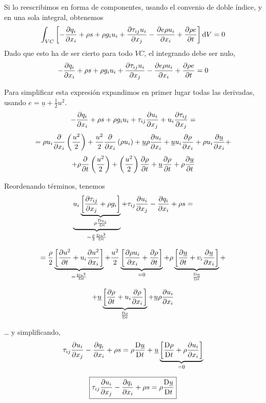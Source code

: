 	Si lo reescribimos en forma de componentes, usando el convenio de
	doble índice, y en una sola integral, obtenemos 
	\[
	\int_{VC}\left[-\frac{\partial q_{i}}{\partial x_{i}}+\rho s+\rho g_{i}u_{i}+\frac{\partial \tau_{ij}u_{i}}{\partial x_{j}}-\frac{\partial e\rho u_{i}}{\partial x_{i}}+\frac{\partial \rho e}{\partial t}\right]\text{d} V=0
	\]
	Dado que esto ha de ser cierto para todo $VC$, el integrando debe
	ser nulo, 
	\[
	-\frac{\partial q_{i}}{\partial x_{i}}+\rho s+\rho g_{i}u_{i}+\frac{\partial \tau_{ij}u_{i}}{\partial x_{j}}-\frac{\partial e\rho u_{i}}{\partial x_{i}}+\frac{\partial \rho e}{\partial t}=0
	\]
	

	
	Para simplificar esta expresión expandimos en primer lugar todas las
	derivadas, usando $e=\underline{u}+\frac{1}{2}u^{2}$. 
	\[
	-\frac{\partial q_{i}}{\partial x_{i}}+\rho s+\rho g_{i}u_{i}+\tau_{ij}\frac{\partial u_{i}}{\partial x_{j}}+u_{i}\frac{\partial \tau_{ij}}{\partial x_{j}}=
	\]
	\[
	=\rho u_{i}\frac{\partial }{\partial x_{i}}\left(\frac{u^{2}}{2}\right)+\frac{u^{2}}{2}\frac{\partial }{\partial x_{i}}\left(\rho u_{i}\right)+\underline{u}\rho\frac{\partial u_{i}}{\partial x_{i}}+\underline{u}u_{i}\frac{\partial \rho}{\partial x_{i}}+\rho u_{i}\frac{\partial \underline{u}}{\partial x_{i}}+
	\]
	\[
	+\rho\frac{\partial \phantom{}}{\partial t}\left(\frac{u^{2}}{2}\right)+\left(\frac{u^{2}}{2}\right)\frac{\partial \rho}{\partial t}+\underline{u}\frac{\partial \rho}{\partial t}+\rho\frac{\partial \underline{u}}{\partial t}
	\]
	

	
	Reordenando términos, tenemos 
	\[
	\underbrace{u_{i}\underbrace{\left[\frac{\partial \tau_{ij}}{\partial x_{j}}+\rho g_{i}\right]}_{\rho\frac{\text{D} u_{i}}{\text{D} t}}}_{=\frac{\rho}{2}\frac{\text{D} u^{2}}{\text{D} t}}+\tau_{ij}\frac{\partial u_{i}}{\partial x_{j}}-\frac{\partial q_{i}}{\partial x_{i}}+\rho s=
	\]
	
	\[
	=\frac{\rho}{2}\underbrace{\left[\frac{\partial u^{2}}{\partial t}+u_{i}\frac{\partial u^{2}}{\partial x_{i}}\right]}_{=\frac{\text{D} u^{2}}{\text{D} t}}+\frac{u^{2}}{2}\underbrace{\left[\frac{\partial \rho u_{i}}{\partial x_{i}}+\frac{\partial \rho}{\partial t}\right]}_{=0}+\rho\underbrace{\left[\frac{\partial \underline{u}}{\partial t}+v_{i}\frac{\partial \underline{u}}{\partial x_{i}}\right]}_{\frac{\text{D} \underline{u}}{\text{D} t}}+
	\]
	
	\[
	+\underline{u}\underbrace{\left[\frac{\partial \rho}{\partial t}+u_{i}\frac{\partial \rho}{\partial x_{i}}\right]}_{\frac{\text{D} \rho}{\text{D} t}}+\underline{u}\rho\frac{\partial u_{i}}{\partial x_{i}}
	\]
	
	
	\ldots{} y simplificando, 
	\[
	\tau_{ij}\frac{\partial u_{i}}{\partial x_{j}}-\frac{\partial q_{i}}{\partial x_{i}}+\rho s=\rho\frac{\text{D} \underline{u}}{\text{D} t}+\underline{u}\underbrace{\left[\frac{\text{D} \rho}{\text{D} t}+\rho\frac{\partial u_{i}}{\partial x_{i}}\right]}_{=0}
	\]
	
	
	
	\begin{equation}
		\boxed{\tau_{ij}\frac{\partial u_{i}}{\partial x_{j}}-\frac{\partial q_{i}}{\partial x_{i}}+\rho s=\rho\frac{\text{D} \underline{u}}{\text{D} t}}
	\end{equation}
	
